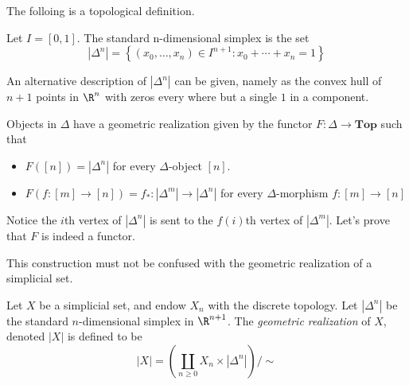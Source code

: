 
The folloing is a topological definition.
\begin{definition}
    Let \(I = [0,1]\). The standard n-dimensional simplex is the set
    \[|{\Delta}^n| = \left\{ (x_0, \dots, x_n)\in I^{n+1 } :  x_0 + \cdots + x_n = 1 \right\}\]
\end{definition}
\begin{remark}
    An alternative description of \(|\Delta^n|\)    can be given, namely as the convex hull of \(n+1\) points in \(\R^n\) with zeros every where but a single \(1\) in a component.
\end{remark}


Objects in \(\Delta\) have a geometric realization given by the  functor \(F\colon \Delta \to \mathbf{Top}\) such that 
\begin{itemize}
    \item \(F([n]) = |\Delta^n|\) for every \(\Delta\)-object \([n]\).
    \item \(F(f\colon [m] \to [n]) = f_*\colon |\Delta^m| \to |\Delta^n| \) for every \(\Delta\)-morphism \(f\colon [m]\to [n]\)
\end{itemize} 
Notice the \(i\)th vertex of \(|\Delta^n|\) is sent to the \(f(i)\)th vertex of \(|\Delta^m|\). 
Let's prove that \(F\) is indeed a functor.

\begin{remark}
    This construction must not be confused with the geometric realization of a simplicial set.
\end{remark}


\begin{definition}[Realization]
    Let \(X\) be a simplicial set, and endow \(X_n\) with the discrete topology.
    Let \(|\Delta^n|\) be the standard \(n\)-dimensional simplex in \(\R^{n+1}\).
    The \textit{geometric realization} of \(X\), denoted \(|X|\) is defined to be 
    \[|X| = \left( \coprod_{n\geq 0}  X_n \times  |\Delta^n| \right)/ \sim\]

\end{definition}





